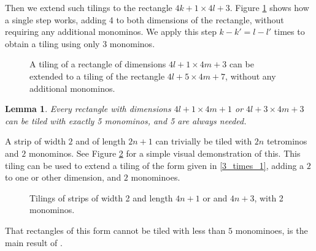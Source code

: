 \documentclass{article}
\theoremstyle{plain}
\newtheorem{lemma}[theorem]{Lemma}
\begin{document}
    Then we extend such tilings to the rectangle $4k + 1 \times 4l + 3$. Figure \ref{extending} shows how a single step works, adding 4 to both dimensions of the rectangle, without requiring any additional monominos. We apply this step $k - k' = l - l'$ times to obtain a tiling using only 3 monominos.
    
    \begin{figure}
    
    \caption{A tiling of a rectangle of dimensions $4l + 1 \times 4m + 3$ can be extended to a tiling of the rectangle $4l + 5 \times 4m + 7$, without any additional monominos.}
    \label{extending}
    \end{figure}

\begin{lemma}\label{3_times_1_strip}
    Every rectangle with dimensions $4l + 1 \times 4m + 1$ or $4l + 3 \times 4m + 3$ can be tiled with exactly 5 monominos, and 5 are always needed.
\end{lemma}

A strip of width $2$ and of length $2n+1$ can trivially be tiled with $2n$ tetrominos and $2$ monominos.
See Figure \ref{strips} for a simple visual demonstration of this.
This tiling can be used to extend a tiling of the form given in \ref{3_times_1}, adding a $2$ to one or other dimension, and $2$ monominoes.

\begin{figure}

\caption{Tilings of strips of width 2 and length $4n + 1$ or and $4n+3$, with 2 monominos.}
\label{strips}
\end{figure}

That rectangles of this form cannot be tiled with less than $5$ monominoes, is the main result of \cite{zhan}.
\end{document}
